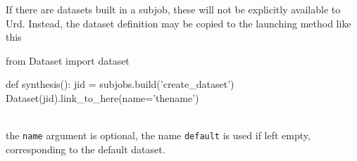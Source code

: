 If there are datasets built in a subjob, these will not be explicitly
available to Urd.  Instead, the dataset definition may be copied to
the launching method like this
\\
\begin{python}
from Dataset import dataset

def synthesis():
  jid = subjobs.build('create_dataset')
  Dataset(jid).link_to_here(name='thename')
\end{python}
\\
the \texttt{name} argument is optional, the name \texttt{default} is
used if left empty, corresponding to the default dataset.
